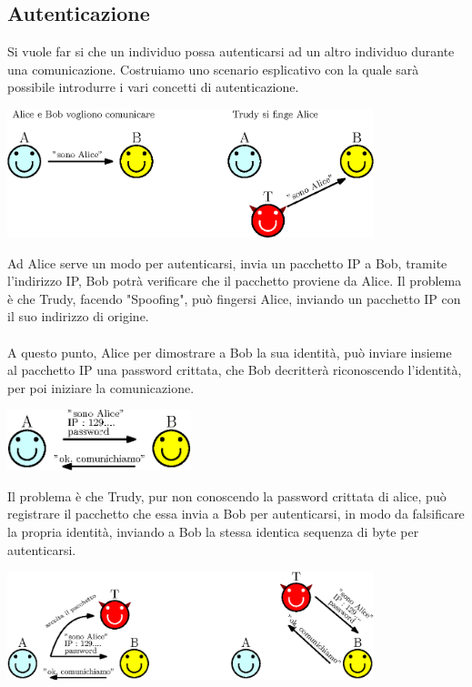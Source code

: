 \documentclass[12pt, letterpaper]{article}
\newcommand{\acc}{\\\hphantom{}\\}
\begin{document}
\subsection{Autenticazione}
Si vuole far si che un individuo possa autenticarsi ad un altro individuo durante una comunicazione. Costruiamo uno scenario 
esplicativo con la quale sarà possibile introdurre i vari concetti di autenticazione.\begin{center}
    \includegraphics[width=0.8\textwidth ]{images/Aut1.eps}
\end{center}
Ad Alice serve un modo per autenticarsi, invia un pacchetto IP a Bob, tramite l'indirizzo IP, Bob potrà verificare che 
il pacchetto proviene da Alice. Il problema è che Trudy, facendo "Spoofing", può fingersi Alice, inviando un pacchetto IP 
con il suo indirizzo di origine.\acc 
A questo punto, Alice per dimostrare a Bob la sua identità, può inviare insieme al pacchetto IP una password 
crittata, che Bob decritterà riconoscendo l'identità, per poi iniziare la comunicazione.\begin{center}
    \includegraphics[width=0.4\textwidth ]{images/Aut2.eps}
\end{center}
Il problema è che Trudy, pur non conoscendo la password crittata di alice, può registrare il pacchetto 
che essa invia a Bob per autenticarsi, in modo da falsificare la propria identità, inviando a Bob la stessa 
identica sequenza di byte per autenticarsi.\begin{center}
    \includegraphics[width=0.8\textwidth ]{images/Aut3.eps}
\end{center}
\end{document}
